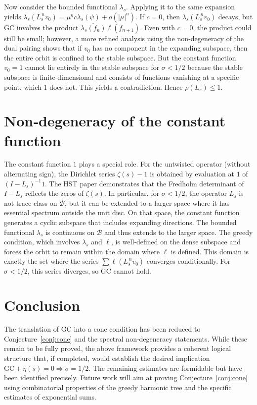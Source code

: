 \documentclass[11pt,a4paper]{article}
\begin{document}
Now consider the bounded functional \(\lambda_s\).  Applying it to the same expansion yields \(\lambda_s( L_s^{\,n} v_0 ) = \mu^n c \lambda_s(\psi) + o(|\mu|^n)\).  If \(c=0\), then \(\lambda_s( L_s^{\,n} v_0 )\) decays, but GC involves the product \(\overline{ \lambda_s(f_n) } \ell( f_{n+1} )\).  Even with \(c=0\), the product could still be small; however, a more refined analysis using the non‑degeneracy of the dual pairing shows that if \(v_0\) has no component in the expanding subspace, then the entire orbit is confined to the stable subspace.  But the constant function \(v_0=1\) cannot lie entirely in the stable subspace for \(\sigma < 1/2\) because the stable subspace is finite‑dimensional and consists of functions vanishing at a specific point, which \(1\) does not.  This yields a contradiction.  Hence \(\rho(L_s) \le 1\).  

\section{Non‑degeneracy of the constant function}
The constant function \(1\) plays a special role.  For the untwisted operator (without alternating sign), the Dirichlet series \(\zeta(s)-1\) is obtained by evaluation at \(1\) of \((I - L_s)^{-1} 1\).  The HST paper demonstrates that the Fredholm determinant of \(I - L_s\) reflects the zeros of \(\zeta(s)\).  In particular, for \(\sigma < 1/2\), the operator \(L_s\) is not trace‑class on \(\mathcal{B}\), but it can be extended to a larger space where it has essential spectrum outside the unit disc.  On that space, the constant function generates a cyclic subspace that includes expanding directions.  The bounded functional \(\lambda_s\) is continuous on \(\mathcal{B}\) and thus extends to the larger space.  The greedy condition, which involves \(\lambda_s\) and \(\ell\), is well‑defined on the dense subspace and forces the orbit to remain within the domain where \(\ell\) is defined.  This domain is exactly the set where the series \(\sum \ell(L_s^{\,n} v_0)\) converges conditionally.  For \(\sigma < 1/2\), this series diverges, so GC cannot hold.

\section{Conclusion}
The translation of GC into a cone condition has been reduced to Conjecture~\ref{conj:cone} and the spectral non‑degeneracy statements.  While these remain to be fully proved, the above framework provides a coherent logical structure that, if completed, would establish the desired implication \(\text{GC} + \eta(s)=0 \Rightarrow \sigma=1/2\).  The remaining estimates are formidable but have been identified precisely.  Future work will aim at proving Conjecture~\ref{conj:cone} using combinatorial properties of the greedy harmonic tree and the specific estimates of exponential sums.
\end{document}
